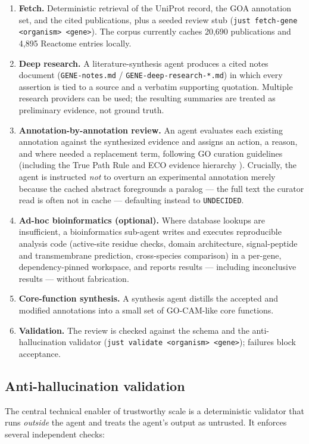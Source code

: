 \documentclass[11pt]{article}
\providecommand{\tightlist}{%
  \setlength{\itemsep}{0pt}\setlength{\parskip}{0pt}}
\newcommand{\code}[1]{\texttt{#1}}
\begin{document}
\begin{enumerate}
\tightlist
\item \textbf{Fetch.} Deterministic retrieval of the UniProt record, the GOA
annotation set, and the cited publications, plus a seeded review stub
(\code{just fetch-gene <organism> <gene>}). The corpus currently caches 20{,}690
publications and 4{,}895 Reactome entries locally.
\item \textbf{Deep research.} A literature-synthesis agent produces a cited notes
document (\code{GENE-notes.md} / \code{GENE-deep-research-*.md}) in which every
assertion is tied to a source and a verbatim supporting quotation. Multiple
research providers can be used; the resulting summaries are treated as preliminary
evidence, not ground truth.
\item \textbf{Annotation-by-annotation review.} An agent evaluates each existing
annotation against the synthesized evidence and assigns an action, a reason, and
where needed a replacement term, following GO curation guidelines (including the
True Path Rule and ECO evidence hierarchy \cite{giglio2019}). Crucially, the agent
is instructed \emph{not} to overturn an experimental annotation merely because the
cached abstract foregrounds a paralog --- the full text the curator read is often
not in cache --- defaulting instead to \code{UNDECIDED}.
\item \textbf{Ad-hoc bioinformatics (optional).} Where database lookups are
insufficient, a bioinformatics sub-agent writes and executes reproducible analysis
code (active-site residue checks, domain architecture, signal-peptide and
transmembrane prediction, cross-species comparison) in a per-gene, dependency-pinned
workspace, and reports results --- including inconclusive results --- without
fabrication.
\item \textbf{Core-function synthesis.} A synthesis agent distills the accepted and
modified annotations into a small set of GO-CAM-like core functions.
\item \textbf{Validation.} The review is checked against the schema and the
anti-hallucination validator (\code{just validate <organism> <gene>}); failures
block acceptance.
\end{enumerate}

\subsection{Anti-hallucination validation}
\label{sec:validation}

The central technical enabler of trustworthy scale is a deterministic validator
that runs \emph{outside} the agent and treats the agent's output as untrusted. It
enforces several independent checks:
\end{document}
